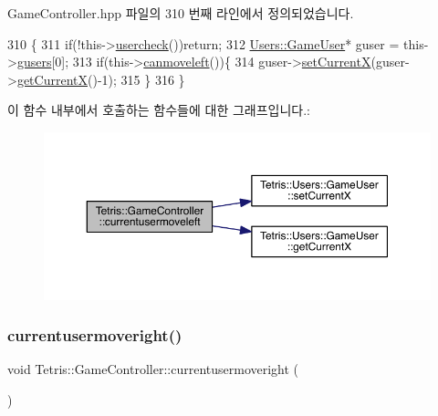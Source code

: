 Game\+Controller.\+hpp 파일의 310 번째 라인에서 정의되었습니다.


\begin{DoxyCode}
310                                       \{
311                 \textcolor{keywordflow}{if}(!this->\hyperlink{class_tetris_1_1_game_controller_ab96e22daad51119b35cbee8cfb7385ef}{usercheck}())\textcolor{keywordflow}{return};
312                 \hyperlink{class_tetris_1_1_users_1_1_game_user}{Users::GameUser}* guser = this->\hyperlink{class_tetris_1_1_game_controller_a1a31d3a933daad6d95e20458eea2900e}{gusers}[0];
313                 \textcolor{keywordflow}{if}(this->\hyperlink{class_tetris_1_1_game_controller_ae541cf926ccdce47a185c94a0c80b642}{canmoveleft}())\{
314                     guser->\hyperlink{class_tetris_1_1_users_1_1_game_user_a2957358b1a6298f06c6c2e10cb89f623}{setCurrentX}(guser->\hyperlink{class_tetris_1_1_users_1_1_game_user_ad25eace96bd27ae6df4a0c0d506be730}{getCurrentX}()-1);
315                 \}
316             \}
\end{DoxyCode}
이 함수 내부에서 호출하는 함수들에 대한 그래프입니다.\+:
\nopagebreak
\begin{figure}[H]
\begin{center}
\leavevmode
\includegraphics[width=350pt]{db/dd2/class_tetris_1_1_game_controller_ac0d40a0936505754131099034b4271fa_cgraph}
\end{center}
\end{figure}
\mbox{\label{class_tetris_1_1_game_controller_a1d2859507cbc9bf9789753228cdedc1f}} 
\subsubsection{\texorpdfstring{currentusermoveright()}{currentusermoveright()}\hspace{0.1cm}{\footnotesize\ttfamily [1/2]}}
{\footnotesize\ttfamily void Tetris\+::\+Game\+Controller\+::currentusermoveright (\begin{DoxyParamCaption}{ }\end{DoxyParamCaption})}



